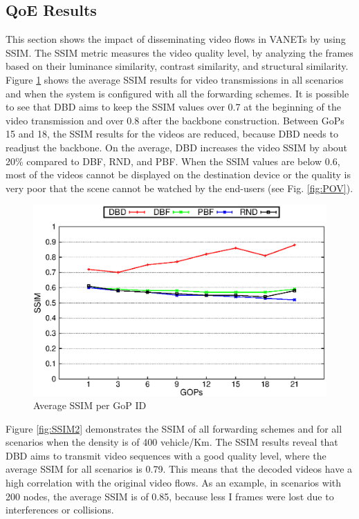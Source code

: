 \documentclass{sig-alternate-2013}
\begin{document}
\subsection{QoE Results}
\label{QoEResults}
This section shows the impact of disseminating video flows in VANETs by using SSIM. The SSIM metric measures the video quality level, by analyzing the frames based on their luminance similarity, contrast similarity, and structural similarity.
Figure \ref{fig:SSIM} shows the average SSIM results for video transmissions in all scenarios and when the system is configured with all the forwarding schemes. It is possible to see that DBD aims to keep the SSIM values over 0.7 at the beginning of the video transmission and over 0.8 after the backbone construction. Between GoPs 15 and 18, the SSIM results for the videos are reduced, because DBD needs to readjust the backbone. On the average, DBD increases the video SSIM by about 20\% compared to DBF, RND, and PBF. When the SSIM values are below 0.6, most of the videos cannot be displayed on the destination device or the quality is very poor that the scene cannot be watched by the end-users (see Fig. \ref{fig:POV}).



\begin{figure}[tb]
\begin{center}
\includegraphics[width=.9\columnwidth]{./fig/selected/LineSSIMxGOPIDfinal.eps}
\caption{Average SSIM per GoP ID}
\label{fig:SSIM}
\end{center}
\end{figure}


Figure \ref{fig:SSIM2} demonstrates the SSIM of all forwarding schemes and for all scenarios when the density is of 400 vehicle/Km. The SSIM results reveal that DBD aims to transmit video sequences with a good quality level, where the average SSIM for all scenarios is 0.79. This means that the decoded videos have a high correlation with the original video flows. As an example, in scenarios with 200 nodes, the average SSIM is of 0.85, because less I frames were lost due to interferences or collisions.
\end{document}
